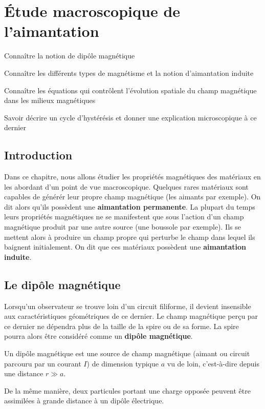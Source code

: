 \chapter{Étude macroscopique de l'aimantation}
\begin{objectif}
	\item Connaître la notion de dipôle magnétique
	\item Connaître les différents types de magnétisme et la notion
	  d'aimantation induite
	\item Connaître les équations qui contrôlent l'évolution spatiale
	  du champ magnétique dans les milieux magnétiques
	\item Savoir décrire un cycle d'hystérésis et donner une explication
          microscopique à ce dernier
\end{objectif}
\section*{Introduction}
Dans ce chapitre, nous allons étudier les propriétés magnétiques des matériaux 
en les abordant d'un point de vue macroscopique. Quelques rares matériaux 
sont capables de générér leur propre champ magnétique (les aimants par exemple).
On dit alors qu'ils possèdent une \textbf{aimantation permanente}.
La plupart du temps leurs propriétés magnétiques
ne se manifestent que sous l'action d'un champ magnétique produit par une autre source
(une boussole par exemple). Ils se mettent alors à produire un champ propre qui
perturbe le champ dans lequel ils baignent initialement. 
On dit que ces matériaux possèdent une \textbf{aimantation
induite}.
\section{Le dipôle magnétique}
	Lorsqu'un observateur se trouve loin d'un circuit filiforme, il devient insensible
	aux caractéristiques géométriques de ce dernier. Le champ magnétique perçu par ce 
	dernier ne dépendra plus de la taille de la spire ou de sa forme. La spire 
	pourra alors être considéré comme un \textbf{dipôle magnétique}.

	\begin{defn}
		Un dipôle magnétique est une source de champ magnétique (aimant 
		ou circuit parcouru par un courant $I$) de dimension typique $a$
		vu de loin, c'est-à-dire depuis une distance $r \gg a$.
	\end{defn}

	\begin{rema}
		De la même manière, deux particules portant une charge opposée
		peuvent être assimilées à grande distance à un dipôle électrique.
	\end{rema}
	
